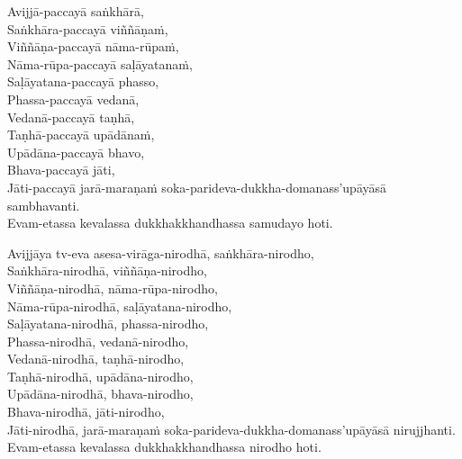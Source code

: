Avijjā-paccayā saṅkhārā,\\
Saṅkhāra-paccayā viññāṇaṁ,\\
Viññāṇa-paccayā nāma-rūpaṁ,\\
Nāma-rūpa-paccayā saḷāyatanaṁ,\\
Saḷāyatana-paccayā phasso,\\
Phassa-paccayā vedanā,\\
Vedanā-paccayā taṇhā,\\
Taṇhā-paccayā upādānaṁ,\\
Upādāna-paccayā bhavo,\\
Bhava-paccayā jāti,\\
Jāti-paccayā jarā-maraṇaṁ soka-parideva-dukkha-domanass'upāyāsā sambhavanti.\\
Evam-etassa kevalassa dukkhakkhandhassa samudayo hoti.

Avijjāya tv-eva asesa-virāga-nirodhā, saṅkhāra-nirodho,\\
Saṅkhāra-nirodhā, viññāṇa-nirodho,\\
Viññāṇa-nirodhā, nāma-rūpa-nirodho,\\
Nāma-rūpa-nirodhā, saḷāyatana-nirodho,\\
Saḷāyatana-nirodhā, phassa-nirodho,\\
Phassa-nirodhā, vedanā-nirodho,\\
Vedanā-nirodhā, taṇhā-nirodho,\\
Taṇhā-nirodhā, upādāna-nirodho,\\
Upādāna-nirodhā, bhava-nirodho,\\
Bhava-nirodhā, jāti-nirodho,\\
Jāti-nirodhā, jarā-maraṇaṁ soka-parideva-dukkha-domanass'upāyāsā nirujjhanti.\\
Evam-etassa kevalassa dukkhakkhandhassa nirodho hoti.

